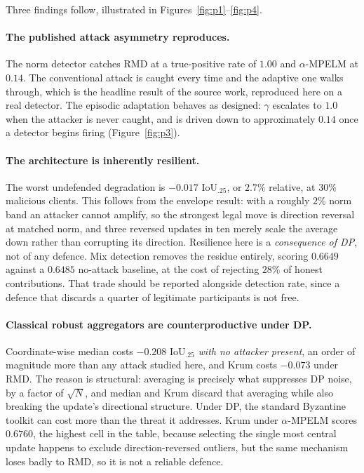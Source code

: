 Three findings follow, illustrated in
Figures~\ref{fig:p1}--\ref{fig:p4}.

\paragraph{The published attack asymmetry reproduces.}
The norm detector catches RMD at a true-positive rate of $1.00$ and
$\alpha$-MPELM at $0.14$. The conventional attack is caught every time and the
adaptive one walks through, which is the headline result of the source work,
reproduced here on a real detector. The episodic adaptation behaves as designed:
$\gamma$ escalates to $1.0$ when the attacker is never caught, and is driven
down to approximately $0.14$ once a detector begins firing
(Figure~\ref{fig:p3}).

\paragraph{The architecture is inherently resilient.}
The worst undefended degradation is $-0.017$ IoU$_{.25}$, or $2.7\%$ relative,
at $30\%$ malicious clients. This follows from the envelope result: with a
roughly $2\%$ norm band an attacker cannot amplify, so the strongest legal move
is direction reversal at matched norm, and three reversed updates in ten merely
scale the average down rather than corrupting its direction. Resilience here is
a \emph{consequence of DP}, not of any defence. Mix detection removes the
residue entirely, scoring $0.6649$ against a $0.6485$ no-attack baseline, at the
cost of rejecting $28\%$ of honest contributions. That trade should be reported
alongside detection rate, since a defence that discards a quarter of legitimate
participants is not free.

\paragraph{Classical robust aggregators are counterproductive under DP.}
Coordinate-wise median costs $-0.208$ IoU$_{.25}$ \emph{with no attacker
present}, an order of magnitude more than any attack studied here, and Krum
costs $-0.073$ under RMD. The reason is structural: averaging is precisely what
suppresses DP noise, by a factor of $\sqrt{N}$, and median and Krum discard that
averaging while also breaking the update's directional structure. Under DP, the
standard Byzantine toolkit can cost more than the threat it addresses. Krum
under $\alpha$-MPELM scores $0.6760$, the highest cell in the table, because
selecting the single most central update happens to exclude direction-reversed
outliers, but the same mechanism loses badly to RMD, so it is not a reliable
defence.

